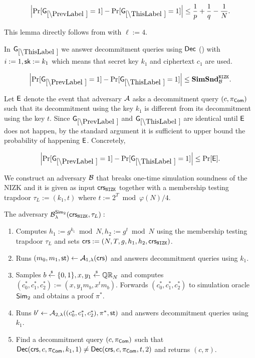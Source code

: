 \begin{lemma}
\[
\left|\Pr[\games_\prevgame = 1] - \Pr[\games_\thisgame = 1]\right| \leq \frac{1}{p}+\frac{1}{q}-\frac{1}{N}.
\]
\end{lemma}

This lemma directly follows from  with $\ell:=4$.



In $\games_\thisgame$ we answer decommitment queries using $\mathsf{Dec}$ () with $i:=1, \mathsf{sk}:=k_1$ which means that secret key $k_1$ and ciphertext $c_1$ are used. 

\begin{lemma}
\[
\left|\Pr[\games_\prevgame = 1] - \Pr[\games_\thisgame = 1]\right| \leq \simsnd^\nizk_\advB. 
\]
\end{lemma}

Let $\mathsf{E}$ denote the event that adversary $\mathcal{A}$ asks a decommitment query $(c, \pi_{\mathsf{Com}})$ such that its decommitment using the key $k_1$ is different from its decommitment using the key $t$. Since $\games_\prevgame$ and $\games_\thisgame$ are identical until $\mathsf{E}$ does not happen, by the standard argument it is sufficient to upper bound the probability of happening $\mathsf{E}$. Concretely,  

\[
\left|\Pr[\games_\prevgame = 1] - \Pr[\games_\thisgame = 1]\right| \leq \Pr[\event]. 
\]

We construct an adversary $\mathcal{B}$ that breaks one-time simulation soundness of the NIZK and it is given as input $\mathsf{crs}_{\mathtt{NIZK}}$ together with a membership testing trapdoor $\tau_L:=(k_1, t)$ where $t:=2^T \bmod \varphi(N)/4$. 

The adversary $\mathcal{B}_{\lambda}^{\mathsf{Sim}_2}(\mathsf{crs}_{\mathtt{NIZK}}, \tau_L):$
\vspace{-2mm}
\begin{enumerate}
\item Computes $h_1:= g^{k_1} \bmod N, h_2:= g^{t} \bmod N$ using the membership testing trapdoor $\tau_L$ and sets $\mathsf{crs}:=(N, T, g, h_1, h_2, \mathsf{crs}_{\mathtt{NIZK}})$.
\item Runs $(m_0, m_1, \mathsf{st}) \leftarrow \mathcal{A}_{1, \lambda}(\mathsf{crs})$ and answers decommitment queries using $k_1$.
\item Samples $b \stackrel{{\scriptscriptstyle\$}}{\leftarrow} \{0,1\}, x, y_1\stackrel{{\scriptscriptstyle\$}}{\leftarrow} \mathbb{QR}_N$ and computes $(c_0^*, c_1^*, c_2^*):=(x, y_1 m_b,\allowbreak x^t m_b)$. Forwards $(c_0^*, c_1^*, c_2^*)$ to simulation oracle $\mathsf{Sim}_2$ and obtains a proof $\pi^*$.
\item Runs $b' \leftarrow \mathcal{A}_{2, \lambda}((c_0^*, c_1^*, c_2^*), \pi^*, \mathsf{st})$ and answers decommitment queries using $k_1$.
\item Find a decommitment query $(c, \pi_{\mathsf{Com}})$ such that $\mathsf{Dec}(\mathsf{crs}, c, \pi_{\mathsf{Com}}, k_1, 1) \neq \mathsf{Dec}(\mathsf{crs},c, \pi_{\mathsf{Com}}, t,2)$ and returns $(c, \pi)$.
\end{enumerate}

